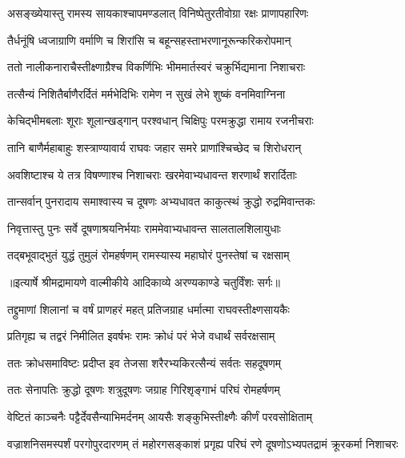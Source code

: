 \twolineshloka
{असङ्ख्येयास्तु रामस्य सायकाश्चापमण्डलात्}
{विनिष्पेतुरतीवोग्रा रक्षः प्राणापहारिणः} %

\twolineshloka
{तैर्धनूंषि ध्वजाग्राणि वर्माणि च शिरांसि च}
{बहून्सहस्ताभरणानूरून्करिकरोपमान्} %

\twolineshloka
{ततो नालीकनाराचैस्तीक्ष्णाग्रैश्च विकर्णिभिः}
{भीममार्तस्वरं चक्रुर्भिद्यमाना निशाचराः} %

\twolineshloka
{तत्सैन्यं निशितैर्बाणैरर्दितं मर्मभेदिभिः}
{रामेण न सुखं लेभे शुष्कं वनमिवाग्निना} %

\twolineshloka
{केचिद्भीमबलाः शूराः शूलान्खड्गान् परश्वधान्}
{चिक्षिपुः परमक्रुद्धा रामाय रजनीचराः} %

\twolineshloka
{तानि बाणैर्महाबाहुः शस्त्राण्यावार्य राघवः}
{जहार समरे प्राणांश्चिच्छेद च शिरोधरान्} %

\twolineshloka
{अवशिष्टाश्च ये तत्र विषण्णाश्च निशाचराः}
{खरमेवाभ्यधावन्त शरणार्थं शरार्दिताः} %

\twolineshloka
{तान्सर्वान् पुनरादाय समाश्वास्य च दूषणः}
{अभ्यधावत काकुत्स्थं क्रुद्धो रुद्रमिवान्तकः} %

\twolineshloka
{निवृत्तास्तु पुनः सर्वे दूषणाश्रयनिर्भयाः}
{राममेवाभ्यधावन्त सालतालशिलायुधाः} %

\twolineshloka
{तद्बभूवाद्भुतं युद्धं तुमुलं रोमहर्षणम्}
{रामस्यास्य महाघोरं पुनस्तेषां च रक्षसाम्} %


{॥इत्यार्षे श्रीमद्रामायणे वाल्मीकीये आदिकाव्ये अरण्यकाण्डे चतुर्विंशः सर्गः॥}


\twolineshloka
{तद्द्रुमाणां शिलानां च वर्षं प्राणहरं महत्}
{प्रतिजग्राह धर्मात्मा राघवस्तीक्ष्णसायकैः} %

\twolineshloka
{प्रतिगृह्य च तद्वरं निमीलित इवर्षभः}
{रामः क्रोधं परं भेजे वधार्थं सर्वरक्षसाम्} %

\twolineshloka
{ततः क्रोधसमाविष्टः प्रदीप्त इव तेजसा}
{शरैरभ्यकिरत्सैन्यं सर्वतः सहदूषणम्} %

\twolineshloka
{ततः सेनापतिः क्रुद्धो दूषणः शत्रुदूषणः}
{जग्राह गिरिशृङ्गाभं परिघं रोमहर्षणम्} %

\twolineshloka
{वेष्टितं काञ्चनैः पट्टैर्देवसैन्याभिमर्दनम्}
{आयसैः शङ्कुभिस्तीक्ष्णैः कीर्णं परवसोक्षिताम्} %

\threelineshloka
{वज्राशनिसमस्पर्शं परगोपुरदारणम्}
{तं महोरगसङ्काशं प्रगृह्य परिघं रणे}
{दूषणोऽभ्यपतद्रामं क्रूरकर्मा निशाचरः} %

